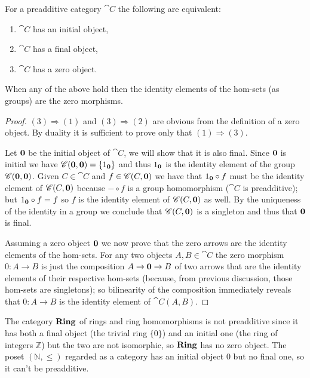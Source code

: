 \begin{proposition}
  \label{prop:existence_of_zero_object}
  For a preadditive category \(\cat{C}\) the following are equivalent:
  \begin{enumerate}[label=(\arabic*)]
  \item \(\cat{C}\) has an initial object,
  \item \(\cat{C}\) has a final object,
  \item \(\cat{C}\) has a zero object.
  \end{enumerate}
  When any of the above hold then the identity elements of the hom-sets (as groups) are the zero morphisms.
\end{proposition}

\begin{proof}
  \((3) \Rightarrow (1)\) and \((3) \Rightarrow (2)\) are obvious from the definition of a zero object. By duality it is sufficient to prove only that \((1) \Rightarrow (3)\).

  Let \({\bf 0}\) be the initial object of \(\cat{C}\), we will show that it is also final. Since \({\bf 0}\) is initial we have \({\mathscr C}({\bf 0},{\bf 0})=\{1_{\bf 0}\}\) and thus \(1_{\bf 0}\) is the identity element of the group \({\mathscr C}({\bf 0},{\bf 0})\). Given \(C\in\cat{C}\) and \(f\in{\mathscr C}(C,{\bf 0})\) we have that \(1_{\bf 0}\circ f\) must be the identity element of \({\mathscr C}(C, {\bf 0})\) because \(-\circ f\) is a group homomorphism (\(\cat{C}\) is preadditive); but \(1_{\bf 0}\circ f = f\) so \(f\) is the identity element of \({\mathscr C}(C, {\bf 0})\) as well. By the uniqueness of the identity in a group we conclude that \({\mathscr C}(C, {\bf 0})\) is a singleton and thus that \({\bf 0}\) is final.

  Assuming a zero object \({\bf 0}\) we now prove that the zero arrows are the identity elements of the hom-sets. For any two objects \(A,B\in\cat{C}\) the zero morphism \(0\colon A\to B\) is just the composition \(A\to{\bf 0}\to B\) of two arrows that are the identity elements of their respective hom-sets (because, from previous discussion, those hom-sets are singletons); so bilinearity of the composition immediately reveals that \(0\colon A\to B\) is the identity element of \(\cat{C}(A,B)\).
\end{proof}

\begin{remark}
  The category \(\text{\normalfont\textbf{Ring}}\) of rings and ring homomorphisms is not preadditive since it has both a final object (the trivial ring \(\{0\}\)) and an initial one (the ring of integers \({\mathbb Z}\)) but the two are not isomorphic, so \(\text{\normalfont\textbf{Ring}}\) has no zero object. The poset \(({\mathbb N}, \leq)\) regarded as a category has an initial object \(0\) but no final one, so it can't be preadditive.
\end{remark}

